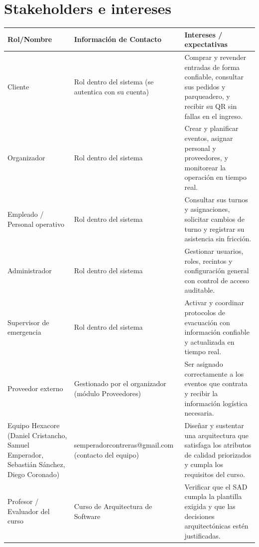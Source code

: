 \documentclass[11pt,a4paper]{article}
\begin{document}
\section{Stakeholders e intereses}
\label{sec:stakeholders}

\begin{center}
\begin{longtable}{|p{3.6cm}|p{3.8cm}|p{6.9cm}|}
\hline
\textbf{Rol/Nombre} & \textbf{Información de Contacto} & \textbf{Intereses / expectativas} \\
\hline
\endhead
Cliente & Rol dentro del sistema (se autentica con su cuenta) & Comprar y revender entradas de
forma confiable, consultar sus pedidos y parqueadero, y recibir su QR sin fallas en el ingreso.\\
\hline
Organizador & Rol dentro del sistema & Crear y planificar eventos, asignar personal y
proveedores, y monitorear la operación en tiempo real.\\
\hline
Empleado / Personal operativo & Rol dentro del sistema & Consultar sus turnos y asignaciones,
solicitar cambios de turno y registrar su asistencia sin fricción.\\
\hline
Administrador & Rol dentro del sistema & Gestionar usuarios, roles, recintos y configuración
general con control de acceso auditable.\\
\hline
Supervisor de emergencia & Rol dentro del sistema & Activar y coordinar protocolos de evacuación
con información confiable y actualizada en tiempo real.\\
\hline
Proveedor externo & Gestionado por el organizador (módulo Proveedores) & Ser asignado
correctamente a los eventos que contrata y recibir la información logística necesaria.\\
\hline
Equipo Hexacore (Daniel Cristancho, Samuel Emperador, Sebastián Sánchez, Diego Coronado) &
semperadorcontreras@gmail.com (contacto del equipo) & Diseñar y sustentar una arquitectura que
satisfaga los atributos de calidad priorizados y cumpla los requisitos del curso.\\
\hline
Profesor / Evaluador del curso & Curso de Arquitectura de Software & Verificar que el SAD cumpla
la plantilla exigida y que las decisiones arquitectónicas estén justificadas.\\
\hline
\end{longtable}
\end{center}

\end{document}
